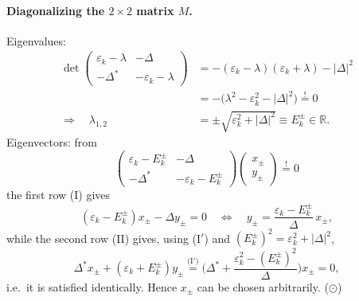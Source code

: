 \documentclass[../../main.tex]{subfiles}
\begin{document}
\paragraph{Diagonalizing the $2\times2$ matrix $M$.}
Eigenvalues:
\begin{align}
\det\begin{pmatrix}\varepsilon_k-\lambda&-\Delta\\
 -\Delta^*&-\varepsilon_k-\lambda\end{pmatrix}
&=-(\varepsilon_k-\lambda)(\varepsilon_k+\lambda)-|\Delta|^2\\
&=-\big(\lambda^2-\varepsilon_k^2-|\Delta|^2\big)\overset{!}{=}0\\
\Longrightarrow\quad \lambda_{1,2}
&=\pm\sqrt{\varepsilon_k^2+|\Delta|^2}\equiv E_k^\pm\in\mathbb{R}. \tag{$\ast_1$}
\end{align}
Eigenvectors: from
\begin{equation}
\begin{pmatrix}\varepsilon_k-E_k^\pm&-\Delta\\
 -\Delta^*&-\varepsilon_k-E_k^\pm\end{pmatrix}
\begin{pmatrix}x_\pm\\y_\pm\end{pmatrix}\overset{!}{=}0
\end{equation}
the first row (I) gives
\begin{equation}
(\varepsilon_k-E_k^\pm)x_\pm-\Delta y_\pm=0
\quad\Longleftrightarrow\quad
y_\pm=\frac{\varepsilon_k-E_k^\pm}{\Delta}\,x_\pm, \tag{I$'$}
\end{equation}
while the second row (II) gives, using (I$'$) and
$(E_k^\pm)^2=\varepsilon_k^2+|\Delta|^2$,
\begin{equation}
\Delta^*x_\pm+(\varepsilon_k+E_k^\pm)y_\pm
\overset{\text{(I}'\text{)}}{=}
\Big(\Delta^*+\frac{\varepsilon_k^2-(E_k^\pm)^2}{\Delta}\Big)x_\pm=0 ,
\end{equation}
i.e.\ it is satisfied identically. Hence $x_\pm$ can be chosen arbitrarily. \hfill($\odot$)
\end{document}
